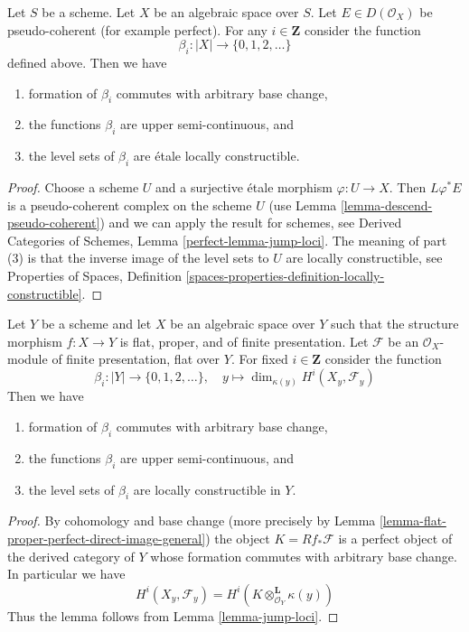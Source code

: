 \begin{lemma}
\label{lemma-jump-loci}
Let $S$ be a scheme. Let $X$ be an algebraic space over $S$.
Let $E \in D(\mathcal{O}_X)$ be pseudo-coherent (for example perfect).
For any $i \in \mathbf{Z}$ consider the function
$$
\beta_i : |X| \longrightarrow \{0, 1, 2, \ldots\}
$$
defined above. Then we have
\begin{enumerate}
\item formation of $\beta_i$ commutes with arbitrary base change,
\item the functions $\beta_i$ are upper semi-continuous, and
\item the level sets of $\beta_i$ are \'etale locally constructible.
\end{enumerate}
\end{lemma}

\begin{proof}
Choose a scheme $U$ and a surjective \'etale morphism $\varphi : U \to X$.
Then $L\varphi^*E$ is a pseudo-coherent complex on the scheme $U$ (use
Lemma \ref{lemma-descend-pseudo-coherent}) and we can apply the result
for schemes, see
Derived Categories of Schemes, Lemma \ref{perfect-lemma-jump-loci}.
The meaning of part (3) is that the inverse image of the level sets
to $U$ are locally constructible, see
Properties of Spaces, Definition
\ref{spaces-properties-definition-locally-constructible}.
\end{proof}

\begin{lemma}
\label{lemma-jump-loci-geometric}
Let $Y$ be a scheme and let $X$ be an algebraic space over $Y$
such that the structure morphism $f : X \to Y$
is flat, proper, and of finite presentation.
Let $\mathcal{F}$ be an $\mathcal{O}_X$-module of finite presentation,
flat over $Y$. For fixed $i \in \mathbf{Z}$ consider the function
$$
\beta_i : |Y| \to \{0, 1, 2, \ldots\},\quad
y \longmapsto \dim_{\kappa(y)} H^i(X_y, \mathcal{F}_y)
$$
Then we have
\begin{enumerate}
\item formation of $\beta_i$ commutes with arbitrary base change,
\item the functions $\beta_i$ are upper semi-continuous, and
\item the level sets of $\beta_i$ are locally constructible in $Y$.
\end{enumerate}
\end{lemma}

\begin{proof}
By cohomology and base change (more precisely by
Lemma \ref{lemma-flat-proper-perfect-direct-image-general})
the object $K = Rf_*\mathcal{F}$ is a perfect object of the derived
category of $Y$ whose formation commutes with arbitrary base change.
In particular we have
$$
H^i(X_y, \mathcal{F}_y) = H^i(K \otimes_{\mathcal{O}_Y}^\mathbf{L} \kappa(y))
$$
Thus the lemma follows from Lemma \ref{lemma-jump-loci}.
\end{proof}

